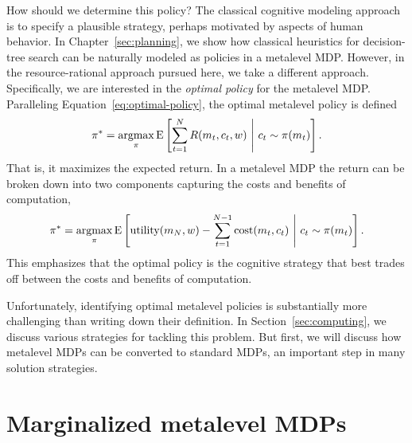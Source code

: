 How should we determine this policy? The classical cognitive modeling approach is to specify a plausible strategy, perhaps motivated by aspects of human behavior. In Chapter~\ref{sec:planning}, we show how classical heuristics for decision-tree search can be naturally modeled as policies in a metalevel MDP. However, in the resource-rational approach pursued here, we take a different approach. Specifically, we are interested in the \emph{optimal policy} for the metalevel MDP. Paralleling Equation~\ref{eq:optimal-policy}, the optimal metalevel policy is defined
%
\begin{equation}\label{eq:optimal-meta-policy}
  \pi^* = \operatorname*{argmax}_\pi \operatorname*{E} \left[ 
    \sum_{t=1}^{N} R(m_t, c_t, w)
   \ \middle\vert\ 
    c_t \sim \pi(m_t)
   \right].
\end{equation}
That is, it maximizes the expected return. In a metalevel MDP the return can be broken down into two components capturing the costs and benefits of computation,
\begin{equation}
  \pi^* = \operatorname*{argmax}_\pi \operatorname*{E} \left[ 
    \text{utility}(m_{N}, w) - \sum_{t=1}^{N-1} \text{cost}(m_t, c_t)
   \ \middle\vert\ 
    c_t \sim \pi(m_t)
   \right].
\end{equation}
This emphasizes that the optimal policy is the cognitive strategy that best trades off between the costs and benefits of computation. 

Unfortunately, identifying optimal metalevel policies is substantially more challenging than writing down their definition. In Section~\ref{sec:computing}, we discuss various strategies for tackling this problem. But first, we will discuss how metalevel MDPs can be converted to standard MDPs, an important step in many solution strategies.



\section{Marginalized metalevel MDPs}\label{sec:metamdp-marginalized}

